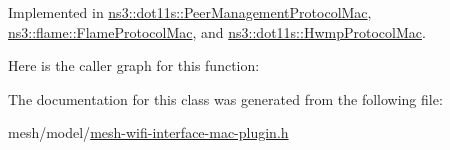 Implemented in \hyperlink{classns3_1_1dot11s_1_1PeerManagementProtocolMac_a124edd9a9cce0b323ff5118d6f0b4069}{ns3\+::dot11s\+::\+Peer\+Management\+Protocol\+Mac}, \hyperlink{classns3_1_1flame_1_1FlameProtocolMac_a2f27306682cf1ea601d7fd9a37d8b875}{ns3\+::flame\+::\+Flame\+Protocol\+Mac}, and \hyperlink{classns3_1_1dot11s_1_1HwmpProtocolMac_ac4e4a220e540cb34c502fa62fe391ef2}{ns3\+::dot11s\+::\+Hwmp\+Protocol\+Mac}.



Here is the caller graph for this function\+:




The documentation for this class was generated from the following file\+:\begin{DoxyCompactItemize}
\item 
mesh/model/\hyperlink{mesh-wifi-interface-mac-plugin_8h}{mesh-\/wifi-\/interface-\/mac-\/plugin.\+h}\end{DoxyCompactItemize}
